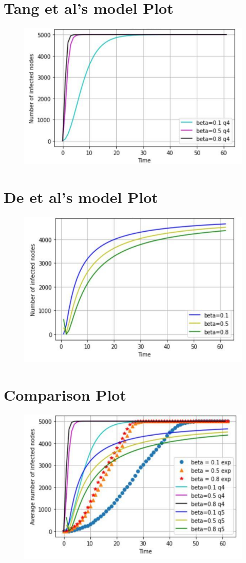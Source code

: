 \documentclass[a4paper]{article}
\begin{document}
	\section{Tang et al's model Plot}
	\begin{figure}[h]
		\centering
		\includegraphics[scale=0.6]{Figures/Fig2}
	\end{figure}
	\pagebreak
	
	\section{De et al's model Plot}
	\begin{figure}[h]
		\centering
		\includegraphics[scale=0.6]{Figures/Fig3}
	\end{figure}
	\pagebreak
	
	\section{Comparison Plot}
	\begin{figure}[h]
		\centering
		\includegraphics[scale=0.6]{Figures/Fig4}
	\end{figure}
	\pagebreak
	
\end{document}

